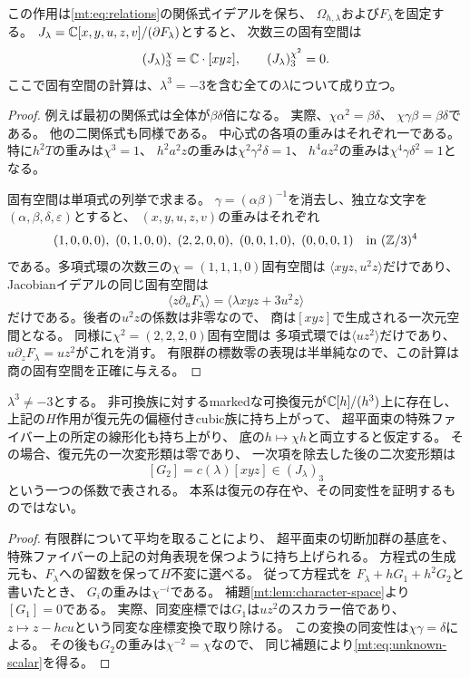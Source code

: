 \begin{lemma}[量子族の同変性とJacobian固有空間]
\label{mt:lem:character-space}
この作用は\eqref{mt:eq:relations}の関係式イデアルを保ち、
$\Omega_{h,\lambda}$および$F_\lambda$を固定する。
$J_\lambda=\mathbb C[x,y,u,z,v]/(\partial F_\lambda)$とすると、
次数三の固有空間は
\begin{equation}\label{mt:eq:character-spaces}
 (J_\lambda)_3^\chi=\mathbb C\cdot[xyz],\qquad
 (J_\lambda)_3^{\chi^2}=0.
\end{equation}
ここで固有空間の計算は、$\lambda^3=-3$を含む全ての$\lambda$について成り立つ。
\end{lemma}
\begin{proof}
例えば最初の関係式は全体が$\beta\delta$倍になる。
実際、$\chi\alpha^2=\beta\delta$、
$\chi\gamma\beta=\beta\delta$である。
他の二関係式も同様である。
中心式の各項の重みはそれぞれ一である。
特に$h^2T$の重みは$\chi^3=1$、
$h^2a^2z$の重みは$\chi^2\gamma^2\delta=1$、
$h^4az^2$の重みは$\chi^4\gamma\delta^2=1$となる。

固有空間は単項式の列挙で求まる。
$\gamma=(\alpha\beta)^{-1}$を消去し、独立な文字を
$(\alpha,\beta,\delta,\varepsilon)$とすると、
$(x,y,u,z,v)$の重みはそれぞれ
\[
 (1,0,0,0),\ (0,1,0,0),\ (2,2,0,0),\
 (0,0,1,0),\ (0,0,0,1)
 \quad\text{in }(\mathbb Z/3)^4
\]
である。多項式環の次数三の$\chi=(1,1,1,0)$固有空間は
$\langle xyz,u^2z\rangle$だけであり、
Jacobianイデアルの同じ固有空間は
\[
 \langle z\partial_uF_\lambda\rangle
 =\langle\lambda xyz+3u^2z\rangle
\]
だけである。後者の$u^2z$の係数は非零なので、
商は$[xyz]$で生成される一次元空間となる。
同様に$\chi^2=(2,2,2,0)$固有空間は
多項式環では$\langle uz^2\rangle$だけであり、
$u\partial_zF_\lambda=uz^2$がこれを消す。
有限群の標数零の表現は半単純なので、この計算は商の固有空間を正確に与える。
\end{proof}

\begin{corollary}[marked同変復元を仮定した二次係数の制約]
\label{mt:cor:second-character}
$\lambda^3\ne-3$とする。
非可換族に対するmarkedな可換復元が$\mathbb C[h]/(h^3)$上に存在し、
上記の$H$作用が復元先の偏極付きcubic族に持ち上がって、
超平面束の特殊ファイバー上の所定の線形化も持ち上がり、
底の$h\mapsto\chi h$と両立すると仮定する。
その場合、復元先の一次変形類は零であり、
一次項を除去した後の二次変形類は
\begin{equation}\label{mt:eq:unknown-scalar}
 [G_2]=c(\lambda)[xyz]\in (J_\lambda)_3
\end{equation}
という一つの係数で表される。
本系は復元の存在や、その同変性を証明するものではない。
\end{corollary}
\begin{proof}
有限群について平均を取ることにより、
超平面束の切断加群の基底を、特殊ファイバーの上記の対角表現を保つように持ち上げられる。
方程式の生成元も、$F_\lambda$への留数を保って$H$不変に選べる。
従って方程式を
$F_\lambda+hG_1+h^2G_2$と書いたとき、
$G_i$の重みは$\chi^{-i}$である。
補題\ref{mt:lem:character-space}より$[G_1]=0$である。
実際、同変座標では$G_1$は$uz^2$のスカラー倍であり、
$z\mapsto z-hc u$という同変な座標変換で取り除ける。
この変換の同変性は$\chi\gamma=\delta$による。
その後も$G_2$の重みは$\chi^{-2}=\chi$なので、
同じ補題により\eqref{mt:eq:unknown-scalar}を得る。
\end{proof}

